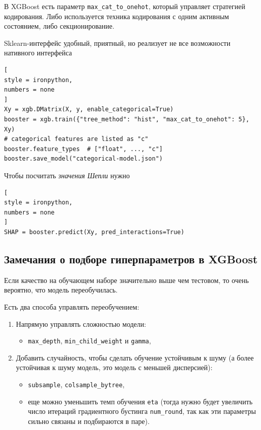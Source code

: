 \documentclass[%
	11pt,
	a4paper,
	utf8,
		]{article}
\begin{document}
В XGBoost есть параметр \verb|max_cat_to_onehot|, который управляет стратегией кодирования. Либо используется техника кодирования с одним активным состоянием, либо секционирование.

Sklearn-интерфейс удобный, приятный, но реализует не все возможности нативного интерфейса
\begin{lstlisting}[
style = ironpython,
numbers = none
]
Xy = xgb.DMatrix(X, y, enable_categorical=True)
booster = xgb.train({"tree_method": "hist", "max_cat_to_onehot": 5}, Xy)
# categorical features are listed as "c"
booster.feature_types  # ["float", ..., "c"]
booster.save_model("categorical-model.json")
\end{lstlisting}

Чтобы посчитать \emph{значения Шепли} нужно
\begin{lstlisting}[
style = ironpython,
numbers = none
]
SHAP = booster.predict(Xy, pred_interactions=True)
\end{lstlisting}


\subsection{Замечания о подборе гиперпараметров в XGBoost}

Если качество на обучающем наборе значительно выше чем тестовом, то очень вероятно, что модель переобучилась.

Есть два способа управлять переобучением:
\begin{enumerate}
	\item Напрямую управлять сложностью модели:
	\begin{itemize}
		\item \verb|max_depth|, \verb|min_child_weight| и \verb|gamma|,
	\end{itemize}
	\item Добавить случайность, чтобы сделать обучение устойчивым к шуму (а более устойчивая к шуму модель, это модель с меньшей дисперсией):
	\begin{itemize}
		\item \verb|subsample|, \verb|colsample_bytree|,
		
		\item еще можно уменьшить темп обучения \verb|eta| (тогда нужно будет увеличить число итераций градиентного бустинга \verb|num_round|, так как эти параметры сильно связаны и подбираются в паре).
	\end{itemize}
\end{enumerate}
\end{document}

